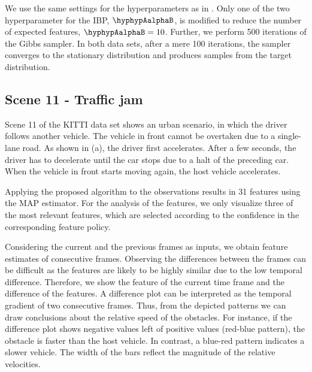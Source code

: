 \documentclass{article}
\begin{document}
We use the same settings for the hyperparameters as in . Only one of the two hyperparameter for the \ac{IBP}, $\hyphypAalphaB$, is modified to reduce the number of expected features, $\hyphypAalphaB = 10$. Further, we perform 500 iterations of the Gibbs sampler. In both data sets, after a mere 100 iterations, the sampler converges to the stationary distribution and produces samples from the target distribution.


\subsection{Scene 11 - Traffic jam}
\label{sec::res::real::0011}
Scene 11 of the KITTI data set shows an urban scenario, in which the driver follows another vehicle.
The vehicle in front cannot be overtaken due to a single-lane road.
As shown in (a), the driver first accelerates.
After a few seconds, the driver has to decelerate until the car stops due to a halt of the preceding car.
When the vehicle in front starts moving again, the host vehicle accelerates.

Applying the proposed algorithm to the observations results in 31 features using the \ac{MAP} estimator. 
For the analysis of the features, we only visualize three of the most relevant features, which are selected according to the confidence in the corresponding feature policy.

Considering the current and the previous frames as inputs, we obtain feature estimates of consecutive frames.
Observing the differences between the frames can be difficult as the features are likely to be highly similar due to the low temporal difference.
Therefore, we show the feature of the current time frame and the difference of the features. 
A difference plot can be interpreted as the temporal gradient of two consecutive frames. 
Thus, from the depicted patterns we can draw conclusions about the relative speed of the obstacles. 
For instance, if the difference plot shows negative values left of positive values (red-blue pattern), the obstacle is faster than the host vehicle. 
In contrast, a blue-red pattern indicates a slower vehicle. 
The width of the bars reflect the magnitude of the relative velocities.
\end{document}
